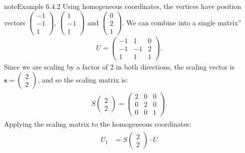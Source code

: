 \documentclass[letterpaper,10pt,english]{jupyterBook}
\begin{document}
\begin{sphinxadmonition}{note}{Example 6.4.2}
\sphinxAtStartPar
Using homogeneous co\sphinxhyphen{}ordinates, the vertices have position vectors \(\begin{pmatrix} -1 \\ -1 \\ 1  \end{pmatrix}\), \(\begin{pmatrix} 1 \\ -1 \\ 1  \end{pmatrix}\) and \(\begin{pmatrix} 0 \\ 2 \\ 1  \end{pmatrix}\). We can combine into a single matrix”
\begin{equation*}
\begin{split} U =
\begin{pmatrix}
    -1 & 1 & 0 \\
    -1 & -1 & 2 \\
    1 & 1 & 1
\end{pmatrix}. \end{split}
\end{equation*}
\sphinxAtStartPar
Since we are scaling by a factor of 2 in both directions, the scaling vector is \(\mathbf{s} = \begin{pmatrix} 2 \\ 2  \end{pmatrix}\), and so the scaling matrix is:
\begin{equation*}
\begin{split} \begin{align*}
    S\begin{pmatrix} 2 \\ 2 \end{pmatrix} = \begin{pmatrix} 2 & 0 & 0 \\ 0 & 2 & 0 \\ 0 & 0 & 1 \end{pmatrix}.
\end{align*} \end{split}
\end{equation*}
\sphinxAtStartPar
Applying the scaling matrix to the homogeneous co\sphinxhyphen{}ordinates:
\begin{equation*}
\begin{split} \begin{align*}
    U_1 &= S\begin{pmatrix} 2 \\ 2 \end{pmatrix} \cdot U \\

\end{align*}
\end{split}
\end{equation*}
\end{sphinxadmonition}
\end{document}
